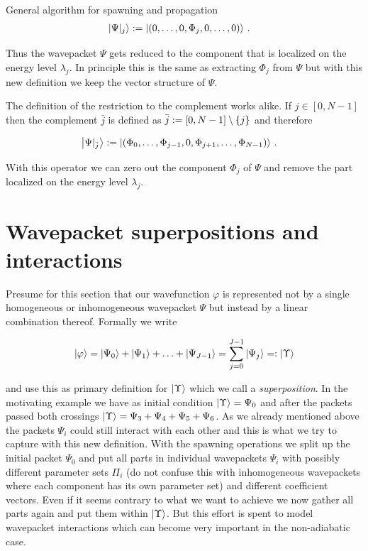 \begin{chapter}{General algorithm for spawning and propagation}
\begin{align}
  \Ket{\Psi |_j} &
  :=
  \Ket{\left(0, \hdots, 0, \Phi_j, 0, \hdots, 0\right)} \,.
\end{align}

Thus the wavepacket $\Psi$ gets reduced to the component that is localized on the
energy level $\lambda_j$. In principle this is the same as extracting $\Phi_j$
from $\Psi$ but with this new definition we keep the vector structure of $\Psi$.

The definition of the restriction to the complement works alike. If $j \in [0, N-1]$
then the complement $\bar{j}$ is defined as $\bar{j} := [0, N-1] \setminus \{j\}$
and therefore

\begin{align}
  \Ket{\Psi |_{\bar{j}}} &
  :=
  \Ket{\left(\Phi_0, \hdots, \Phi_{j-1}, 0, \Phi_{j+1}, \hdots, \Phi_{N-1}\right)} \,.
\end{align}

With this operator we can zero out the component $\Phi_j$ of $\Psi$ and remove
the part localized on the energy level $\lambda_j$.


\section{Wavepacket superpositions and interactions}

Presume for this section that our wavefunction $\varphi$ is represented not by a
single homogeneous or inhomogeneous wavepacket $\Psi$ but instead by a linear combination
thereof. Formally we write

\begin{equation}
  \Ket{\varphi} = \Ket{\Psi_0} + \Ket{\Psi_1} + \ldots + \Ket{\Psi_{J-1}} = \sum_{j=0}^{J-1} \Ket{\Psi_j} =: \Ket{\Upsilon}
\end{equation}

and use this as primary definition for $\Ket{\Upsilon}$ which we call a \emph{superposition}.
In the motivating example we have as initial condition $\Ket{\Upsilon} = \Psi_0$
and after the packets passed both crossings $\Ket{\Upsilon} = \Psi_3 + \Psi_4 + \Psi_5 + \Psi_6$.
As we already mentioned above the packets $\Psi_i$ could still interact with each
other and this is what we try to capture with this new definition. With the spawning
operations we split up the initial packet $\Psi_0$ and put all parts in individual
wavepackets $\Psi_i$ with possibly different parameter sets $\Pi_i$ (do not confuse
this with inhomogeneous wavepackets where each component has its own parameter set)
and different coefficient vectors. Even if it seems contrary to what we want to
achieve we now gather all parts again and put them within $\Ket{\Upsilon}$. But
this effort is spent to model wavepacket interactions which can become very
important in the non-adiabatic case.


\end{chapter}
